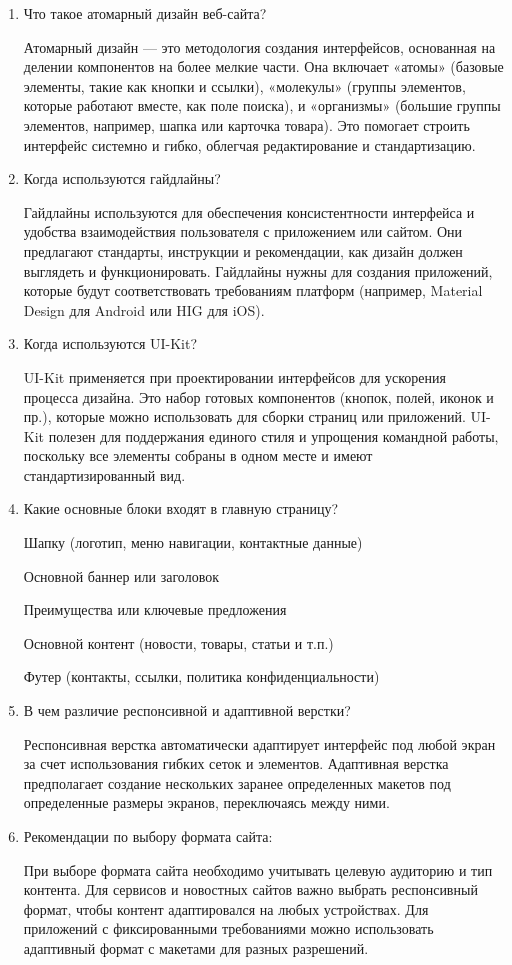 \begin{enumerate}
    \item Что такое атомарный дизайн веб-сайта?

    Атомарный дизайн — это методология создания интерфейсов, основанная на делении компонентов на более мелкие части. Она включает «атомы» (базовые элементы, такие как кнопки и ссылки), «молекулы» (группы элементов, которые работают вместе, как поле поиска), и «организмы» (большие группы элементов, например, шапка или карточка товара). Это помогает строить интерфейс системно и гибко, облегчая редактирование и стандартизацию.

\item Когда используются гайдлайны?

    Гайдлайны используются для обеспечения консистентности интерфейса и удобства взаимодействия пользователя с приложением или сайтом. Они предлагают стандарты, инструкции и рекомендации, как дизайн должен выглядеть и функционировать. Гайдлайны нужны для создания приложений, которые будут соответствовать требованиям платформ (например, Material Design для Android или HIG для iOS).

\item Когда используются UI-Kit?

    UI-Kit применяется при проектировании интерфейсов для ускорения процесса дизайна. Это набор готовых компонентов (кнопок, полей, иконок и пр.), которые можно использовать для сборки страниц или приложений. UI-Kit полезен для поддержания единого стиля и упрощения командной работы, поскольку все элементы собраны в одном месте и имеют стандартизированный вид.

\item Какие основные блоки входят в главную страницу?

        Шапку (логотип, меню навигации, контактные данные)

        Основной баннер или заголовок

        Преимущества или ключевые предложения

        Основной контент (новости, товары, статьи и т.п.)

        Футер (контакты, ссылки, политика конфиденциальности)

    \item В чем различие респонсивной и адаптивной верстки?

    Респонсивная верстка автоматически адаптирует интерфейс под любой экран за счет использования гибких сеток и элементов. Адаптивная верстка предполагает создание нескольких заранее определенных макетов под определенные размеры экранов, переключаясь между ними.

\item Рекомендации по выбору формата сайта:

    При выборе формата сайта необходимо учитывать целевую аудиторию и тип контента. Для сервисов и новостных сайтов важно выбрать респонсивный формат, чтобы контент адаптировался на любых устройствах. Для приложений с фиксированными требованиями можно использовать адаптивный формат с макетами для разных разрешений.


\end{enumerate}


